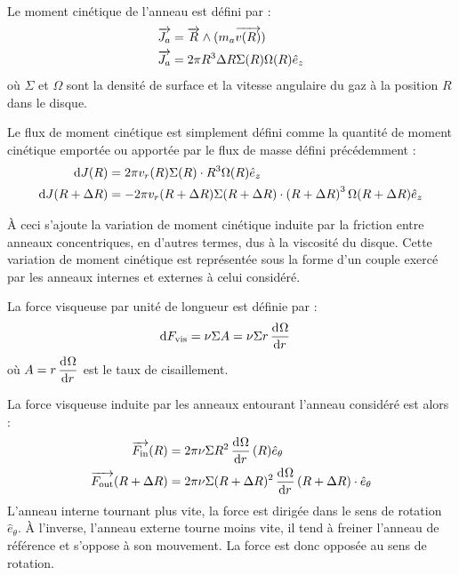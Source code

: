 Le moment cinétique de l'anneau est défini par :
\begin{align}
\vect{J_a} &= \vect{R} \wedge (m_a\vect{v(R)}) \nonumber\\
\vect{J_a} &= 2\pi R^3 \Delta R \Sigma(R)\Omega(R)\hat{e}_z\label{eq:J_a}
\end{align}
où $\Sigma$ et $\Omega$ sont la densité de surface et la vitesse angulaire du gaz à la position $R$ dans le disque.

Le flux de moment cinétique est simplement défini comme la quantité de moment cinétique emportée ou apportée par le flux de masse défini précédemment  :
\begin{subequations}
\begin{align}
\operatorname{d \!} J(R) &= 2\pi v_r(R) \Sigma(R)\cdot R^3\Omega(R)\hat{e}_z\label{eq:dJ_in}\\
\operatorname{d \!} J(R+\Delta R) &= -2\pi v_r(R+\Delta R) \Sigma(R+\Delta R)\cdot \left(R+\Delta R\right)^3\Omega(R+\Delta R)\hat{e}_z\label{eq:dJ_out}
\end{align}\label{eq:dJ}
\end{subequations}

\bigskip

À ceci s'ajoute la variation de moment cinétique induite par la friction entre anneaux concentriques, en d'autres termes, dus à la viscosité du disque. Cette variation de moment cinétique est représentée sous la forme d'un couple exercé par les anneaux internes et externes à celui considéré. 

La force visqueuse par unité de longueur est définie par :
\begin{align}
\operatorname{d \!} F_\text{vis} &= \nu \Sigma A = \nu \Sigma r \mathinner{ \dfrac{\operatorname{d \!}{^{}}\Omega}{\operatorname{d \!}{{r}^{}}} }
\end{align}
où $A=r \mathinner{ \dfrac{\operatorname{d \!}{^{}}\Omega}{\operatorname{d \!}{{r}^{}}} }$ est le taux de cisaillement.

La force visqueuse induite par les anneaux entourant l'anneau considéré est alors : 
\begin{subequations}
\begin{align}
{\overrightarrow{F_\text{in}}}(R)&= 2\pi\nu \Sigma R^2 \mathinner{ \dfrac{\operatorname{d \!}{^{}}\Omega}{\operatorname{d \!}{{r}^{}}} }(R) \hat{e}_\theta\\
{\overrightarrow{F_\text{out}}}(R+\Delta R)&= 2\pi\nu \Sigma (R+\Delta R)^2 \mathinner{ \dfrac{\operatorname{d \!}{^{}}\Omega}{\operatorname{d \!}{{r}^{}}} }(R+\Delta R) \cdot \hat{e}_\theta
\end{align}
\end{subequations}
L'anneau interne tournant plus vite, la force est dirigée dans le sens de rotation $\hat{e}_\theta$. À l'inverse, l'anneau externe tourne moins vite, il tend à freiner l'anneau de référence et s'oppose à son mouvement. La force est donc opposée au sens de rotation.

